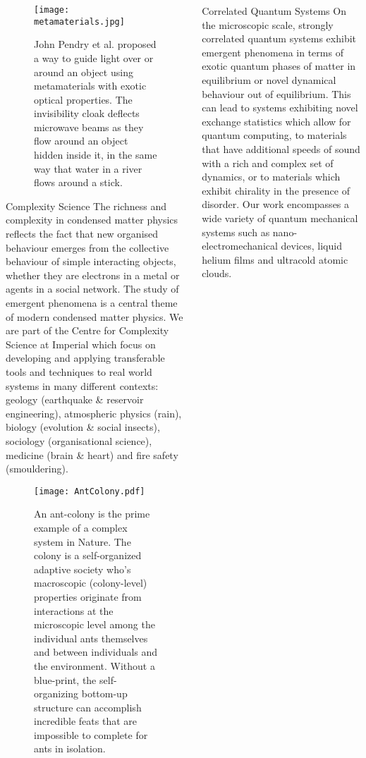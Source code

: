 \documentclass[xcolor={table}]{beamer}
\begin{document}
\begin{frame}[fragile=singleslide,t]
\begin{columns}[onlytextwidth,T]
\begin{column}{.47\textwidth}
\begin{figure}
    \texttt{[image: metamaterials.jpg]}
    \caption{\footnotesize John Pendry et al. proposed a way to guide light over or around an object using metamaterials with exotic optical properties. The invisibility cloak deflects microwave beams as they flow around an object hidden inside it, in the same way that water in a river flows around a stick.}
\end{figure}

\begin{block}{Complexity Science}
The richness and complexity in condensed matter physics reflects the fact that
new organised behaviour emerges from the collective behaviour of simple
interacting objects, whether they are electrons in a metal or agents in a social
network. The study of emergent phenomena is a central theme of modern condensed
matter physics. We are part of the Centre for Complexity Science at Imperial
which focus on developing and applying transferable tools and techniques to real
world systems in many different contexts: geology (earthquake \& reservoir
engineering), atmospheric physics (rain), biology (evolution \& social insects),
sociology (organisational science), medicine (brain \& heart) and fire safety
(smouldering).
\end{block}

\begin{figure}
    \centering
    \texttt{[image: AntColony.pdf]}
    \caption{\footnotesize An ant-colony is the prime example of a complex system in Nature. The colony is a self-organized adaptive society who’s macroscopic (colony-level) properties originate from interactions at the microscopic level among the individual ants themselves and between individuals and the environment. Without a blue-print, the self-organizing bottom-up structure can accomplish incredible feats that are impossible to complete for ants in isolation.}
\end{figure}

\end{column}

\begin{column}{.47\textwidth}

\begin{block}{Correlated Quantum Systems}
On the microscopic scale, strongly correlated quantum systems exhibit emergent
phenomena in terms of exotic quantum phases of matter in equilibrium or novel
dynamical behaviour out of equilibrium. This can lead to systems exhibiting
novel exchange statistics which allow for quantum computing, to materials that
have additional speeds of sound with a rich and complex set of dynamics, or to
materials which exhibit chirality in the presence of disorder. Our work
encompasses a wide variety of quantum mechanical systems such as
nano-electromechanical devices, liquid helium films and ultracold atomic clouds.
\end{block}


\end{column}
\end{columns}
\end{frame}
\end{document}

